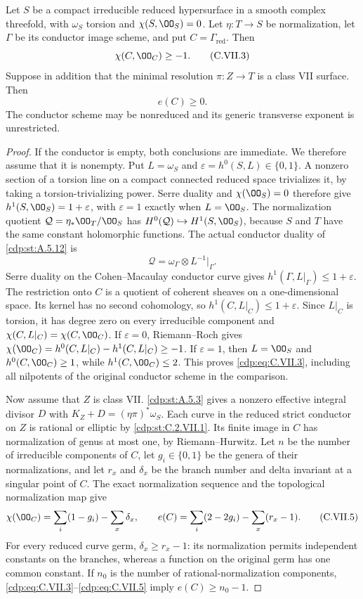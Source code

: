
\begin{proposition}\label{cdp:st:C.2.VII.2}

Let $S$ be a compact irreducible reduced hypersurface in
a smooth complex threefold, with $\omega_S$ torsion and
$\chi(S,\OO_S)=0$. Let $\eta:T\to S$ be normalization,
let $\Gamma$ be its conductor image scheme, and put
$C=\Gamma_{\mathrm{red}}$. Then
\[
 \chi(C,\OO_C)\ge-1.
\tag{C.VII.3}\label{cdp:eq:C.VII.3}
\]
Suppose in addition that the minimal resolution
$\pi:Z\to T$ is a class VII surface. Then
\[
 e(C)\ge0.
\tag{C.VII.4}\label{cdp:eq:C.VII.4}
\]
The conductor scheme may be nonreduced and its generic
transverse exponent is unrestricted.
\end{proposition}
\begin{proof}
If the conductor is empty, both conclusions are immediate.
We therefore assume that it is nonempty.
Put $L=\omega_S$ and
$\varepsilon=h^0(S,L)\in\{0,1\}$.
A nonzero section of a torsion line on a compact
connected reduced space trivializes it, by taking a
torsion-trivializing power. Serre duality and
$\chi(\OO_S)=0$ therefore give
$h^1(S,\OO_S)=1+\varepsilon$, with
$\varepsilon=1$ exactly when $L=\OO_S$.
The normalization quotient
$\mathcal Q=\eta_*\OO_T/\OO_S$ has
$H^0(\mathcal Q)\hookrightarrow H^1(S,\OO_S)$,
because $S$ and $T$ have the same constant holomorphic
functions. The actual conductor duality of \ref{cdp:st:A.5.12} is
\[
 \mathcal Q=\omega_\Gamma\otimes L^{-1}|_\Gamma .
\]
Serre duality on the Cohen--Macaulay conductor curve
gives $h^1(\Gamma,L|_\Gamma)\le1+\varepsilon$.
The restriction onto $C$ is a quotient of coherent
sheaves on a one-dimensional space. Its kernel has
no second cohomology, so
$h^1(C,L|_C)\le1+\varepsilon$.
Since $L|_C$ is torsion, it has degree zero on every
irreducible component and
$\chi(C,L|_C)=\chi(C,\OO_C)$.
If $\varepsilon=0$, Riemann--Roch gives
$\chi(\OO_C)=h^0(C,L|_C)-h^1(C,L|_C)\ge-1$.
If $\varepsilon=1$, then $L=\OO_S$ and
$h^0(C,\OO_C)\ge1$, while $h^1(C,\OO_C)\le2$.
This proves \eqref{cdp:eq:C.VII.3}, including all nilpotents of
the original conductor scheme in the comparison.

Now assume that $Z$ is class VII. \ref{cdp:st:A.5.3} gives a
nonzero effective integral divisor $D$ with
$K_Z+D=(\eta\pi)^*\omega_S$.
Each curve in the reduced strict conductor on $Z$
is rational or elliptic by \ref{cdp:st:C.2.VII.1}. Its finite image
in $C$ has normalization of genus at most one, by
Riemann--Hurwitz. Let $n$ be the number of irreducible
components of $C$, let $g_i\in\{0,1\}$ be the genera
of their normalizations, and let $r_x$ and $\delta_x$
be the branch number and delta invariant at a singular
point of $C$. The exact normalization sequence and
the topological normalization map give
\[
 \chi(\OO_C)=\sum_i(1-g_i)-\sum_x\delta_x,\qquad
 e(C)=\sum_i(2-2g_i)-\sum_x(r_x-1).
\tag{C.VII.5}\label{cdp:eq:C.VII.5}
\]
For every reduced curve germ,
$\delta_x\ge r_x-1$: its normalization permits
independent constants on the branches, whereas a
function on the original germ has one common constant.
If $n_0$ is the number of rational-normalization
components, \eqref{cdp:eq:C.VII.3}--\eqref{cdp:eq:C.VII.5} imply
$e(C)\ge n_0-1$.


\end{proof}
